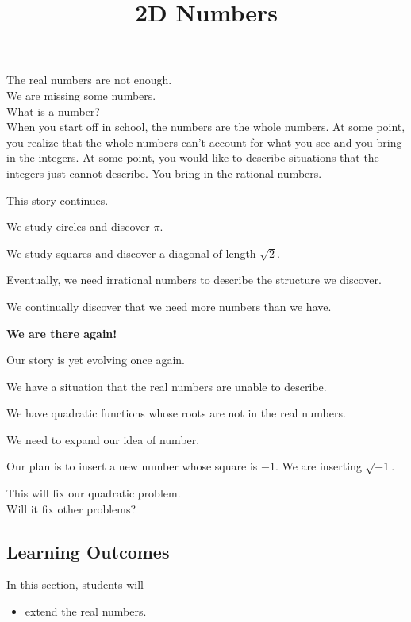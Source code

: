 \documentclass{ximera}
\title{2D Numbers}
\begin{document}
\begin{abstract}
\end{abstract}
\maketitle





The real numbers are not enough. \\


We are missing some numbers. \\


What is a number? \\


When you start off in school, the numbers are the whole numbers.  At some point, you realize that the whole numbers can't account for what you see and you bring in the integers.  At some point, you would like to describe situations that the integers just cannot describe.  You bring in the rational numbers. 


This story continues.

We study circles and discover $\pi$.

We study squares and discover a diagonal of length $\sqrt{2}$.


Eventually, we need irrational numbers to describe the structure we discover.


We continually discover that we need more numbers than we have. \\


\begin{center}
\textbf{\textcolor{red!90!darkgray}{We are there again!}}
\end{center}


Our story is yet evolving once again.


\begin{explanation}

We have a situation that the real numbers are unable to describe.


We have quadratic functions whose roots are not in the real numbers.  


We need to expand our idea of number.

\end{explanation}



Our plan is to insert a new number whose square is $-1$.  We are inserting $\sqrt{-1}$.  


This will fix our quadratic problem. \\


Will it fix other problems?






\subsection{Learning Outcomes}



\begin{sectionOutcomes}
In this section, students will 

\begin{itemize}
\item extend the real numbers.
\end{itemize}
\end{sectionOutcomes}
\end{document}
